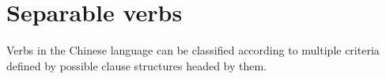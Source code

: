 \documentclass[../main.tex]{subfiles}
\begin{document}
\section{Separable verbs}

Verbs in the Chinese language can be classified according to multiple criteria defined by possible clause 
structures headed by them. %
\end{document}
